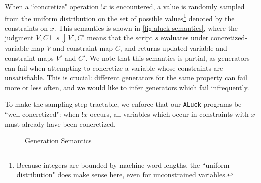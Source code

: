\documentclass[sigconf,nonacm,review,anonymous]{acmart}
\begin{document}
When a ``concretize" operation $!x$ is encountered, a value is randomly sampled from
the uniform distribution on the set of possible values\footnote{ Because
integers are bounded by machine word lengths, the ``uniform distribution" does
make sense here, even for unconstrained variables.  } denoted by the constraints
on $x$. This semantics is shown in \autoref{fig:aluck-semantics}, where the
judgment $V,C \vdash s \Downarrow V',C'$ means that the script $s$ evaluates
under concretized-variable-map $V$ and constraint map $C$, and returns updated
variable and constraint maps $V'$ and $C'$. We note that this semantics is partial,
as generators can fail when attempting to concretize a variable whose constraints are unsatisfiable.
This is crucial: different generators for the same property can fail more or
less often, and we would like to infer generators which fail infrequently.

To make the sampling step tractable, we enforce that our \texttt{ALuck} programs be
``well-concretized": when $!x$ occurs, all variables which occur
in constraints with $x$ must already have been concretized.



\begin{figure}
\vspace{-10px}
\caption{Generation Semantics}
\label{fig:aluck-semantics}

\vspace{-15px}
\end{figure}
\end{document}
